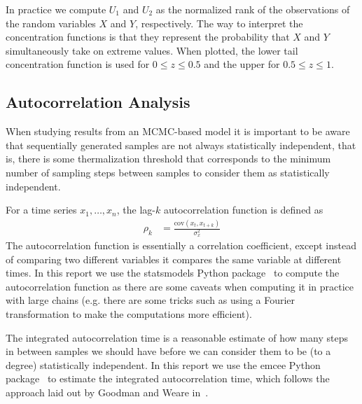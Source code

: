 In practice we compute \( U_1 \) and \( U_2 \) as the normalized rank of the observations of the random variables \( X \) and \( Y \), respectively.
The way to interpret the concentration functions is that they represent the probability that \( X \) and \( Y \) simultaneously take on extreme values.
When plotted, the lower tail concentration function is used for \( 0 \le z \le 0.5 \) and the upper for \( 0.5 \le z \le 1 \).

\subsection{Autocorrelation Analysis}\label{app:autocorrelation_analysis}
When studying results from an MCMC-based model it is important to be aware that sequentially generated samples are not always statistically independent, that is, there is some thermalization threshold that corresponds to the minimum number of sampling steps between samples to consider them as statistically independent.

For a time series \( x_1, \dots, x_n \), the lag-\( k \) autocorrelation function is defined as~\cite{time_series_analysis}
\begin{align}
    \rho_k
        &= \frac{\text{cov}(x_t, x_{t+k})}{\sigma_{x}^2}
\end{align}
The autocorrelation function is essentially a correlation coefficient, except instead of comparing two different variables it compares the same variable at different times.
In this report we use the statsmodels Python package~\cite{python_statsmodels} to compute the autocorrelation function as there are some caveats when computing it in practice with large chains (e.g. there are some tricks such as using a Fourier transformation to make the computations more efficient).

The integrated autocorrelation time is a reasonable estimate of how many steps in between samples we should have before we can consider them to be (to a degree) statistically independent.
In this report we use the emcee Python package~\cite{python_emcee} to estimate the integrated autocorrelation time, which follows the approach laid out by Goodman and Weare in~\cite{goodman_weare_2010}.

